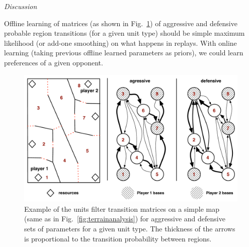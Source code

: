 \vspace{0.3cm}
\textit{Discussion}\\
\vspace{0.2cm}

Offline learning of matrices (as shown in Fig.~\ref{fig:examplefilter}) of aggressive and defensive probable region transitions (for a given unit type) should be simple maximum likelihood (or add-one smoothing) on what happens in replays. With online learning (taking previous offline learned parameters as priors), we could learn preferences of a given opponent.

\begin{figure}
\begin{center}
\includegraphics[width=15cm]{images/units_filter_markov.pdf}
\caption{Example of the units filter transition matrices on a simple map (same as in Fig.~\ref{fig:terrainanalysis}) for aggressive and defensive sets of parameters for a given unit type. The thickness of the arrows is proportional to the transition probability between regions.}
\label{fig:examplefilter}
\end{center}
\end{figure}

